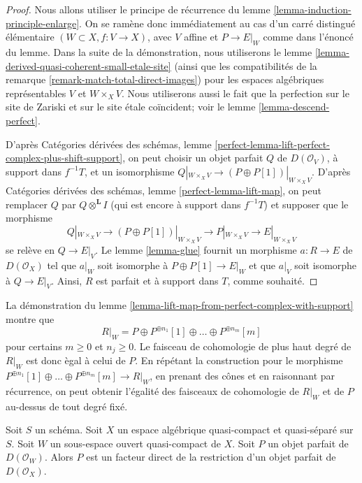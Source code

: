 \begin{proof}
Nous allons utiliser le principe de r\'ecurrence du lemme
\ref{lemma-induction-principle-enlarge}. On se ram\`ene donc imm\'ediatement
au cas d'un carr\'e distingu\'e \'el\'ementaire
$(W\subset X,f:V\to X)$, avec $V$ affine et $P\to E|_W$ comme dans l'\'enonc\'e
du lemme. Dans la suite de la d\'emonstration, nous utiliserons le lemme
\ref{lemma-derived-quasi-coherent-small-etale-site} (ainsi que les
compatibilit\'es de la remarque \ref{remark-match-total-direct-images}) pour
les espaces alg\'ebriques repr\'esentables $V$ et $W\times_XV$. Nous
utiliserons aussi le fait que la perfection sur le site de Zariski et sur le
site \'etale co\"incident; voir le lemme \ref{lemma-descend-perfect}.

\medskip\noindent
D'apr\`es Cat\'egories d\'eriv\'ees des sch\'emas, lemme
\ref{perfect-lemma-lift-perfect-complex-plus-shift-support}, on peut choisir un
objet parfait $Q$ de $D(\mathcal{O}_V)$, \`a support dans $f^{-1}T$, et un
isomorphisme
$Q|_{W\times_XV}\to(P\oplus P[1])|_{W\times_XV}$. D'apr\`es Cat\'egories
d\'eriv\'ees des sch\'emas, lemme \ref{perfect-lemma-lift-map}, on peut
remplacer $Q$ par $Q\otimes^\mathbf{L}I$ (qui est encore \`a support dans
$f^{-1}T$) et supposer que le morphisme
$$
Q|_{W \times_X V} \to (P \oplus P[1])|_{W \times_X V}
\longrightarrow P|_{W \times_X V}
\longrightarrow
E|_{W \times_X V}
$$
se rel\`eve en $Q\to E|_V$. Le lemme \ref{lemma-glue} fournit un morphisme
$a:R\to E$ de $D(\mathcal{O}_X)$ tel que $a|_W$ soit isomorphe \`a
$P\oplus P[1]\to E|_W$ et que $a|_V$ soit isomorphe \`a $Q\to E|_V$.
Ainsi, $R$ est parfait et \`a support dans $T$, comme souhait\'e.
\end{proof}

\begin{remark}
\label{remark-addendum}
La d\'emonstration du lemme
\ref{lemma-lift-map-from-perfect-complex-with-support} montre que
$$
R|_W = P \oplus P^{\oplus n_1}[1] \oplus \ldots \oplus P^{\oplus n_m}[m]
$$
pour certains $m\geq0$ et $n_j\geq0$. Le faisceau de cohomologie de plus haut
degr\'e de $R|_W$ est donc \`egal \`a celui de $P$. En r\'ep\'etant la
construction pour le morphisme
$P^{\oplus n_1}[1]\oplus\ldots\oplus P^{\oplus n_m}[m]\to R|_W$, en prenant
des c\^ones et en raisonnant par r\'ecurrence, on peut obtenir l'\'egalit\'e des
faisceaux de cohomologie de $R|_W$ et de $P$ au-dessus de tout degr\'e fix\'e.
\end{remark}

\begin{lemma}
\label{lemma-direct-summand-of-a-restriction}
Soit $S$ un sch\'ema. Soit $X$ un espace alg\'ebrique quasi-compact et
quasi-s\'epar\'e sur $S$. Soit $W$ un sous-espace ouvert quasi-compact de $X$.
Soit $P$ un objet parfait de $D(\mathcal{O}_W)$. Alors $P$ est un facteur
direct de la restriction d'un objet parfait de $D(\mathcal{O}_X)$.
\end{lemma}

